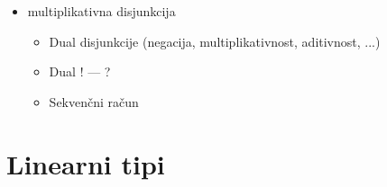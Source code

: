 \documentclass[12pt, titlepage, a4paper]{article}
\begin{document}
\begin{itemize}
            \item multiplikativna disjunkcija
            
            \begin{itemize}
                \item Dual disjunkcije (negacija, multiplikativnost, aditivnost, ...)
                \item Dual ! --- ?
                \item Sekvenčni račun
            \end{itemize}

    
\end{itemize}
\pagebreak


\section{Linearni tipi}
\end{document}
